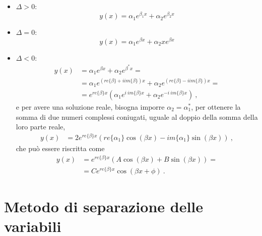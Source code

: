 \begin{itemize}
    \item $\Delta > 0$:
    \begin{equation}
       y(x) = \alpha_1 e^{\beta_1 x} + \alpha_2 e^{\beta_2 x}
    \end{equation}
    \item $\Delta = 0$:
    \begin{equation}
       y(x) = \alpha_1 e^{\beta x} + \alpha_2 x e^{\beta x}
    \end{equation}
    \item $\Delta < 0$:
    \begin{equation}
    \begin{aligned}
       y(x) & = \alpha_1 e^{\beta x} + \alpha_2 e^{\beta^* x} = \\
            & = \alpha_1 e^{(re\{ \beta \} + i im\{\beta\})x} + \alpha_2 e^{(re\{ \beta \} - i im\{\beta\}) x} = \\
            & = e^{re\{ \beta \}x} \left( \alpha_1 e^{i \ im\{\beta\} x} +  \alpha_2 e^{-i \ im\{\beta\}x }  \right) \ ,
    \end{aligned}
    \end{equation}
    e per avere una soluzione reale, bisogna imporre $\alpha_2 = \alpha_1^*$, per ottenere la somma di due numeri complessi coniugati, uguale al doppio della somma della loro parte reale,
    \begin{equation}
    \begin{aligned}
       y(x)  & = 2 e^{re\{ \beta \}x} \left( re\{ \alpha_1 \} \cos(\beta x) - im\{\alpha_1 \} \sin(\beta x) \right) \ ,
    \end{aligned}
    \end{equation}
che può essere riscritta come
    \begin{equation}
    \begin{aligned}
       y(x)  & = e^{re\{ \beta \}x} \left( A \cos(\beta x) + B \sin(\beta x) \right) = \\ 
             & = C e^{re\{ \beta \}x} \cos(\beta x + \phi)  \ .
    \end{aligned}
    \end{equation}
\end{itemize}

\chapter{Metodo di separazione delle variabili}

